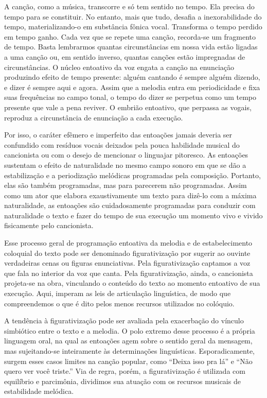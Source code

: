 A canção, como a música, transcorre e só tem sentido no tempo. Ela
precisa do tempo para se constituir. No entanto, mais que tudo, desafia
a inexorabilidade do tempo, materializando-o em substância fônica vocal.
Transforma o tempo perdido em tempo ganho. Cada vez que se repete uma
canção, recorda-se um fragmento de tempo. Basta lembrarmos quantas
circunstâncias em nossa vida estão ligadas a uma canção ou, em sentido
inverso, quantas canções estão impregnadas de circunstâncias. O núcleo
entoativo da voz engata a canção na enunciação produzindo efeito de
tempo presente: alguém cantando é sempre alguém dizendo, e dizer é
sempre aqui e agora. Assim que a melodia entra em periodicidade e fixa
suas frequências no campo tonal, o tempo do dizer se perpetua como um
tempo presente que vale a pena reviver. O embrião entoativo, que
perpassa as vogais, reproduz a circunstância de enunciação a cada
execução.

Por isso, o caráter efêmero e imperfeito das entoações jamais deveria
ser confundido com resíduos vocais deixados pela pouca habilidade
musical do cancionista ou com o desejo de mencionar o linguajar
pitoresco. As entoações sustentam o efeito de naturalidade no mesmo
campo sonoro em que se dão a estabilização e a periodização melódicas
programadas pela composição. Portanto, elas são também programadas, mas
para parecerem não programadas. Assim como um ator que elabora
exaustivamente um texto para dizê-lo com a máxima naturalidade, as
entoações são cuidadosamente programadas para conduzir com naturalidade
o texto e fazer do tempo de sua execução um momento vivo e vivido
fisicamente pelo cancionista.

Esse processo geral de programação entoativa da melodia e de
estabelecimento coloquial do texto pode ser denominado figurativização
por sugerir ao ouvinte verdadeiras cenas ou figuras enunciativas. Pela
figurativização captamos a voz que fala no interior da voz que canta.
Pela figurativização, ainda, o cancionista projeta-se na obra,
vinculando o conteúdo do texto ao momento entoativo de sua execução.
Aqui, imperam as leis de articulação linguística, de modo que
compreendemos o que é dito pelos menos recursos utilizados no colóquio.

A tendência à figurativização pode ser avaliada pela exacerbação do
vínculo simbiótico entre o texto e a melodia. O polo extremo desse
processo é a própria linguagem oral, na qual as entoações agem sobre o
sentido geral da mensagem, mas sujeitando-se inteiramente às
determinações linguísticas. Esporadicamente, surgem esses casos limites
na canção popular, como ``Deixa isso pra lá'' e ``Não quero ver você
triste.'' Via de regra, porém, a figurativização é utilizada com
equilíbrio e parcimônia, dividimos sua atuação com os recursos musicais
de estabilidade melódica.

